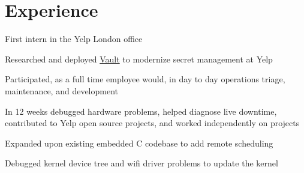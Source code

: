 \documentclass[letterpaper]{deedy-resume} %
\begin{document}
\begin{minipage}[t]{0.66\textwidth} %


\section{Experience}


\vspace{\topsep} %

\begin{tightitemize}
\item First intern in the Yelp London office
\end{tightitemize}

\sectionspace %




\begin{tightitemize}
\item Researched and deployed \href{https://vaultproject.io}{Vault} to modernize secret management at Yelp
\item Participated, as a full time employee would, in day to day operations
  triage, maintenance, and development
\item In 12 weeks debugged hardware problems, helped diagnose live downtime,
  contributed to Yelp open source projects, and worked independently on projects
\end{tightitemize}

\sectionspace %




\begin{tightitemize}
\item Expanded upon existing embedded C codebase to add remote scheduling
\item Debugged kernel device tree and wifi driver problems to update the kernel
\end{tightitemize}


\end{minipage}
\end{document}
